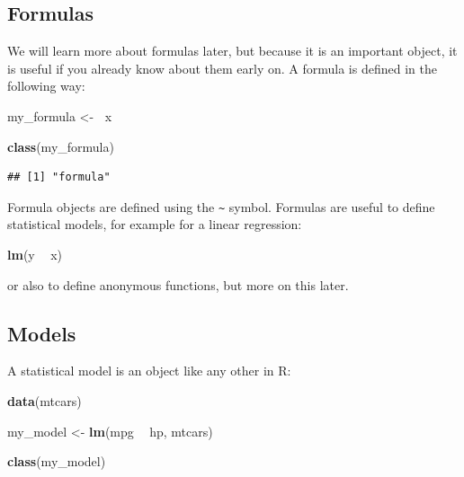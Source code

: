 \documentclass[]{gitbook}
\newenvironment{Shaded}{\begin{snugshade}}{\end{snugshade}}
\newcommand{\ErrorTok}[1]{\textcolor[rgb]{0.64,0.00,0.00}{\textbf{#1}}}
\newcommand{\KeywordTok}[1]{\textcolor[rgb]{0.13,0.29,0.53}{\textbf{#1}}}
\newcommand{\NormalTok}[1]{#1}
\newcommand{\OperatorTok}[1]{\textcolor[rgb]{0.81,0.36,0.00}{\textbf{#1}}}
\newcommand{\StringTok}[1]{\textcolor[rgb]{0.31,0.60,0.02}{#1}}
\theoremstyle{definition}
\theoremstyle{definition}
\theoremstyle{definition}
\theoremstyle{remark}
\begin{document}
\hypertarget{formulas}{%
\subsection{Formulas}\label{formulas}}

We will learn more about formulas later, but because it is an important
object, it is useful if you already know about them early on. A formula
is defined in the following way:

\begin{Shaded}
\begin{Highlighting}[]
\NormalTok{my_formula <-}\StringTok{ }\ErrorTok{~}\NormalTok{x}

\KeywordTok{class}\NormalTok{(my_formula)}
\end{Highlighting}
\end{Shaded}

\begin{verbatim}
## [1] "formula"
\end{verbatim}

Formula objects are defined using the \texttt{\textasciitilde{}} symbol.
Formulas are useful to define statistical models, for example for a
linear regression:

\begin{Shaded}
\begin{Highlighting}[]
\KeywordTok{lm}\NormalTok{(y }\OperatorTok{~}\StringTok{ }\NormalTok{x)}
\end{Highlighting}
\end{Shaded}

or also to define anonymous functions, but more on this later.

\hypertarget{models}{%
\subsection{Models}\label{models}}

A statistical model is an object like any other in R:

\begin{Shaded}
\begin{Highlighting}[]
\KeywordTok{data}\NormalTok{(mtcars)}

\NormalTok{my_model <-}\StringTok{ }\KeywordTok{lm}\NormalTok{(mpg }\OperatorTok{~}\StringTok{ }\NormalTok{hp, mtcars)}

\KeywordTok{class}\NormalTok{(my_model)}
\end{Highlighting}
\end{Shaded}
\end{document}
